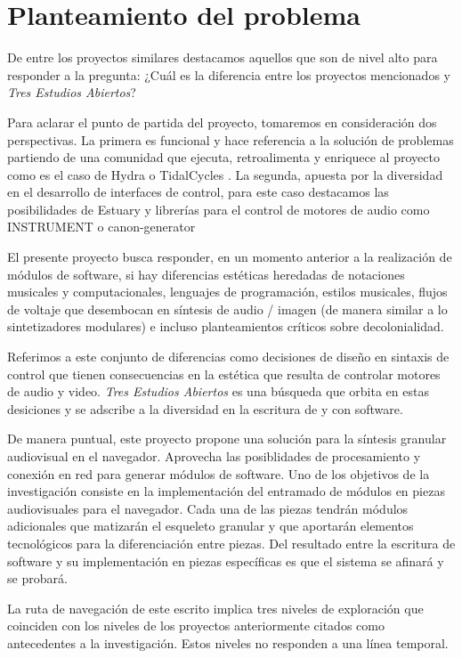 \section*{Planteamiento del problema}

De entre los proyectos similares destacamos aquellos que son de nivel alto para responder a la pregunta: ¿Cuál es la diferencia entre los proyectos mencionados y \textit{Tres Estudios Abiertos}?

Para aclarar el punto de partida del proyecto, tomaremos en consideración dos perspectivas. La primera es funcional y hace referencia a la solución de problemas partiendo de una comunidad que ejecuta, retroalimenta y enriquece al proyecto como es el caso de Hydra \citep{hydra} o TidalCycles \citep{tidal}. La segunda, apuesta por la diversidad en el desarrollo de interfaces de control, para este caso destacamos las posibilidades de Estuary \citep{estuary} y librerías para el control de motores de audio como INSTRUMENT \citep{instrument} o canon-generator \citep{canongenerator}

El presente proyecto busca responder, en un momento anterior a la realización de módulos de software, si hay diferencias estéticas heredadas de notaciones musicales y computacionales, lenguajes de programación,  estilos musicales, flujos de voltaje que desembocan en síntesis de audio / imagen (de manera similar a lo sintetizadores modulares) e incluso planteamientos críticos sobre decolonialidad.

Referimos a este conjunto de diferencias como decisiones de diseño en sintaxis de control que tienen consecuencias en la estética que resulta de controlar motores de audio y video. \textit{Tres Estudios Abiertos} es una búsqueda que orbita en estas desiciones y se adscribe a la diversidad en la escritura de y con software. 

De manera puntual, este proyecto propone una solución para la síntesis granular audiovisual en el navegador. Aprovecha las posiblidades de procesamiento y conexión en red para generar módulos de software. Uno de los objetivos de la investigación consiste en la implementación del entramado de módulos en piezas audiovisuales para el navegador. Cada una de las piezas tendrán módulos adicionales que matizarán el esqueleto granular y que aportarán elementos tecnológicos para la diferenciación entre piezas. Del resultado entre la escritura de software y su implementación en piezas específicas es que el sistema se afinará y se probará. 

La ruta de navegación de este escrito implica tres niveles de exploración que coinciden con los niveles de los proyectos anteriormente citados como antecedentes a la investigación. Estos niveles no responden a una línea temporal.  

